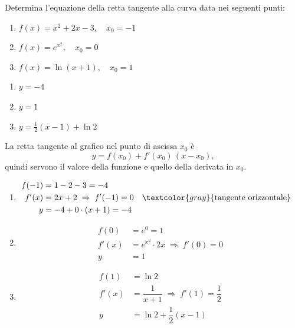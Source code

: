 
\begin{question}[ID=2.1, subtitle={Retta tangente in tre punti assegnati}, tags={derivate, retta tangente}, difficulty=media]
Determina l'equazione della retta tangente alla curva data nei seguenti punti:
\begin{center}\begin{minipage}{0.85\linewidth}
\begin{enumerate}[label=\arabic*)]
\item $f(x) = x^2 + 2x - 3, \quad x_0 = -1$
\item $f(x) = e^{x^2}, \quad x_0 = 0$
\item $f(x) = \ln(x+1), \quad x_0 = 1$
\end{enumerate}
\end{minipage}\end{center}
\begin{solution}
\begin{enumerate}[label=\arabic*)]
    \item $y=-4$
    \item $y=1$
    \item $y=\tfrac12(x-1)+\ln2$
\end{enumerate}
\end{solution}
\begin{explanation}
La retta tangente al grafico nel punto di ascissa $x_0$ è
\[ y=f(x_0)+f'(x_0)\,(x-x_0), \]
quindi servono il valore della funzione e quello della derivata in $x_0$.
\begin{enumerate}[label=\arabic*)]
    \item \[\begin{aligned}
    f(-1) &= 1-2-3=-4\\
    f'(x) &= 2x+2 \;\Rightarrow\; f'(-1)=0 && \textcolor{gray}{\text{tangente orizzontale}}\\
    y &= -4+0\cdot(x+1)=-4
    \end{aligned}\]
    \item \[\begin{aligned}
    f(0) &= e^0=1\\
    f'(x) &= e^{x^2}\cdot2x \;\Rightarrow\; f'(0)=0\\
    y &= 1
    \end{aligned}\]
    \item \[\begin{aligned}
    f(1) &= \ln2\\
    f'(x) &= \dfrac{1}{x+1} \;\Rightarrow\; f'(1)=\dfrac12\\
    y &= \ln2+\dfrac12(x-1)
    \end{aligned}\]
\end{enumerate}
\end{explanation}
\end{question}

